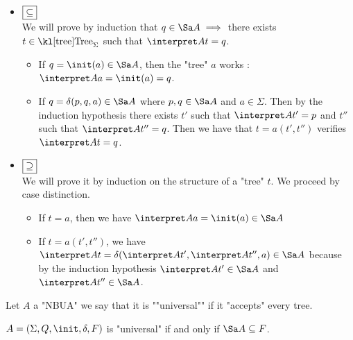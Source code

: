 \documentclass{article}
\begin{document}
\begin{proofI}
	\begin{itemize}
		\item $\fbox{$\subseteq$}$\vspace{0.15cm}\\
		      We will prove by induction that $q \in \Sa A \implies$ there exists $t \in \tree_\Sigma$ such that
		      $\interpret A t = q$.

		      \begin{itemize}
			      \item If $q = \init(a) \in \Sa A$, then the "tree" $a$ works : $\interpret A a = \init (a) = q$.
			      \item If $q = \delta (p,q,a) \in \Sa A$ where $p,q \in \Sa A$ and $a \in \Sigma$. Then by the induction hypothesis
			            there exists $t'$ such that $\interpret A {t'} = p$ and $t''$ such that $\interpret A {t''} = q$.
			            Then we have that $t = a(t',t'')$ verifies $\interpret A t = q$.
		      \end{itemize}
		\item $\fbox{$\supseteq$}$\vspace{0.15cm}\\
		      We will prove it by induction on the structure of a "tree" $t$. We proceed by case distinction.
		      \begin{itemize}
			      \item If $t = a$, then we have $ \interpret A a = \init (a) \in \Sa A$
			      \item If $t = a(t',t'')$, we have $ \interpret A t = \delta(\interpret A {t'}, \interpret A {t''}, a) \in \Sa A$
			            because by the induction hypothesis $\interpret A {t'} \in \Sa A$  and $\interpret A {t''} \in \Sa A$.
		      \end{itemize}
	\end{itemize}
\end{proofI}

\begin{definition}
	Let $A $ a "NBUA" we say that it is ""universal"" if it "accepts" every tree.
\end{definition}


\begin{theorem}
	$A = \DBUA$ is "universal" if and only if $\Sa A \subseteq F$.
\end{theorem}
\end{document}
